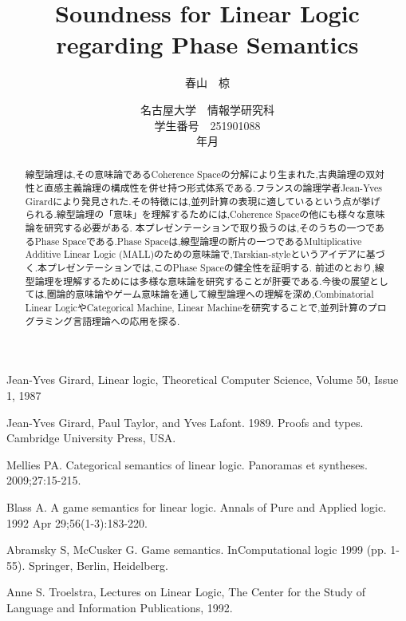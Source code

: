 \documentclass{jarticle}
\title{Soundness for Linear Logic regarding Phase Semantics}
\author{春山　椋}
\date{
  名古屋大学　情報学研究科\\
  学生番号　251901088\\
  \the\year 年\the\month 月}
\theoremstyle{break} %
\theoremstyle{definition}
\begin{document}
\maketitle

\begin{abstract}
  線型論理\cite{girard87}は,その意味論であるCoherence Space\cite{prot}の分解により生まれた,古典論理の双対性と直感主義論理の構成性を併せ持つ形式体系である.フランスの論理学者Jean-Yves Girardにより発見された.その特徴には,並列計算の表現に適しているという点が挙げられる.線型論理の「意味」を理解するためには,Coherence Spaceの他にも様々な意味論を研究する必要がある.
本プレゼンテーションで取り扱うのは,そのうちの一つであるPhase Space\cite{girard87}である.Phase Spaceは,線型論理の断片の一つであるMultiplicative Additive Linear Logic (MALL)のための意味論で,Tarskian-styleというアイデアに基づく.本プレゼンテーションでは,このPhase Spaceの健全性を証明する.
前述のとおり,線型論理を理解するためには多様な意味論を研究することが肝要である.今後の展望としては,圏論的意味論\cite{mellies09}やゲーム意味論\cite{blass92}\cite{abra99}を通して線型論理への理解を深め,Combinatorial Linear LogicやCategorical Machine, Linear Machine\cite{tor}を研究することで,並列計算のプログラミング言語理論への応用を探る.
\end{abstract}

\begin{thebibliography}{99}
  Jean-Yves Girard,
  Linear logic,
  Theoretical Computer Science,
  Volume 50, Issue 1,
  1987

  Jean-Yves Girard, 
  Paul Taylor, 
  and Yves Lafont. 
  1989. 
  Proofs and types. 
  Cambridge University Press, 
  USA.

  Mellies PA.
  Categorical semantics of linear logic.
  Panoramas et syntheses.
  2009;27:15-215.
  
  Blass A.
  A game semantics for linear logic.
  Annals of Pure and Applied logic.
  1992 Apr 29;56(1-3):183-220.
  
  Abramsky S, McCusker G.
  Game semantics.
  InComputational logic 1999 (pp. 1-55).
  Springer, Berlin, Heidelberg.
  
  Anne S. Troelstra,
  Lectures on Linear Logic,
  The Center for the Study of Language and Information Publications,
  1992.
\end{thebibliography}
\end{document}
